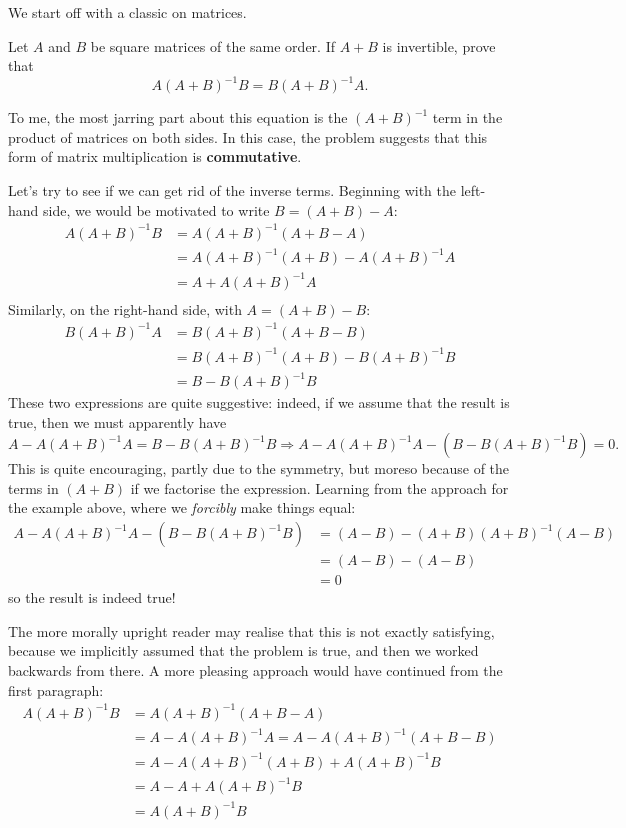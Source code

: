 \documentclass[../jarvis.tex]{subfiles}
\begin{document}
We start off with a classic on matrices.
\begin{example}[Classic]
Let $A$ and $B$ be square matrices of the same order. If $A+B$ is invertible, prove that $$A(A+B)^{-1}B=B(A+B)^{-1}A.$$
\end{example}
To me, the most jarring part about this equation is the $(A+B)^{-1}$ term in the product of matrices on both sides. In this case, the problem suggests that this form of matrix multiplication is \textbf{commutative}.

Let's try to see if we can get rid of the inverse terms. Beginning with the left-hand side, we would be motivated to write $B=(A+B)-A$:
\begin{align*}
    A(A+B)^{-1}B &= A(A+B)^{-1}(A+B-A) \\
    &= A(A+B)^{-1}(A+B)-A(A+B)^{-1}A \\
    &= A+A(A+B)^{-1}A \\
\end{align*}
Similarly, on the right-hand side, with $A=(A+B)-B$:
\begin{align*}
    B(A+B)^{-1}A &= B(A+B)^{-1}(A+B-B) \\
    &= B(A+B)^{-1}(A+B)-B(A+B)^{-1}B \\
    &= B-B(A+B)^{-1}B
\end{align*}
These two expressions are quite suggestive: indeed, if we assume that the result is true, then we must apparently have 
$$A-A(A+B)^{-1}A=B-B(A+B)^{-1}B \Longrightarrow A-A(A+B)^{-1}A-(B-B(A+B)^{-1}B)=0.$$
This is quite encouraging, partly due to the symmetry, but moreso because of the terms in $(A+B)$ if we factorise the expression. Learning from the approach for the example above, where we \textit{forcibly} make things equal:
\begin{align*}
    A-A(A+B)^{-1}A-(B-B(A+B)^{-1}B) &= (A-B)-(A+B)(A+B)^{-1}(A-B) \\
    &= (A-B)-(A-B) \\
    &= 0
\end{align*}
so the result is indeed true!

The more morally upright reader may realise that this is not exactly satisfying, because we implicitly assumed that the problem is true, and then we worked backwards from there. A more pleasing approach would have continued from the first paragraph:
\begin{align*}
    A(A+B)^{-1}B &= A(A+B)^{-1}(A+B-A) \\
    &= A-A(A+B)^{-1}A = A-A(A+B)^{-1}(A+B-B) \\
    &= A-A(A+B)^{-1}(A+B)+A(A+B)^{-1}B \\
    &= A-A+A(A+B)^{-1}B \\
    &= A(A+B)^{-1}B
\end{align*}
\end{document}
